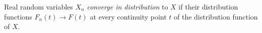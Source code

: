
Real random variables $X_n$ \emph{converge in distribution} to $X$ if their distribution functions $F_n(t)\to F(t)$ at every continuity point $t$ of the distribution function of $X$.
